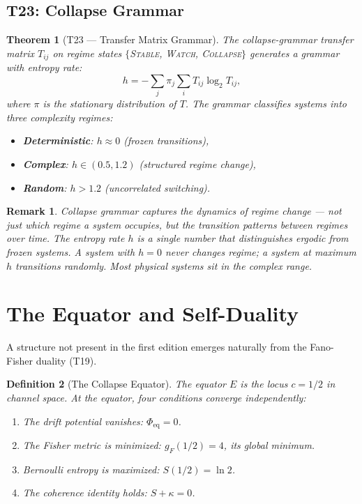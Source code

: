 \documentclass[
  aps,
  prd,
  preprint,
  superscriptaddress,
  nofootinbib,
  floatfix,
  longbibliography
]{revtex4-2}
\newtheorem{theorem}{Theorem}
\newtheorem{definition}[theorem]{Definition}
\newtheorem{remark}{Remark}
\newcommand{\beq}{\begin{equation}}
\newcommand{\eeq}{\end{equation}}
\newcommand{\regime}[1]{\textrm{\upshape\scshape#1}}
\newcommand{\Ent}{S}
\newcommand{\Logint}{\kappa}
\newcommand{\gFisher}{g_{\!F}}
\begin{document}
\subsection{T23: Collapse Grammar}

\begin{theorem}[T23 — Transfer Matrix Grammar]\label{thm:T23}
The collapse-grammar transfer matrix
$T_{ij}$ on regime states
$\{$\regime{Stable}, \regime{Watch}, \regime{Collapse}$\}$
generates a grammar with entropy rate:
\beq
  h = -\sum_{j} \pi_j \sum_{i} T_{ij} \log_2 T_{ij},
\eeq
where $\pi$ is the stationary distribution of $T$.
The grammar classifies systems into three complexity regimes:
\begin{itemize}[nosep,leftmargin=*]
  \item \textbf{Deterministic}: $h \approx 0$
    \quad(frozen transitions),
  \item \textbf{Complex}: $h \in (0.5, 1.2)$
    \quad(structured regime change),
  \item \textbf{Random}: $h > 1.2$
    \quad(uncorrelated switching).
\end{itemize}
\end{theorem}

\begin{remark}
Collapse grammar captures the \emph{dynamics} of regime
change — not just which regime a system occupies, but
the transition patterns between regimes over time.
The entropy rate $h$ is a single number that distinguishes
ergodic from frozen systems.
A system with $h = 0$ never changes regime;
a system at maximum $h$ transitions randomly.
Most physical systems sit in the complex range.
\end{remark}

\section{The Equator and Self-Duality}\label{sec:equator}

A structure not present in the first edition emerges naturally
from the Fano-Fisher duality (T19).

\begin{definition}[The Collapse Equator]\label{def:equator}
The equator $E$ is the locus $c = 1/2$ in channel space.
At the equator, four conditions converge independently:
\begin{enumerate}[nosep,leftmargin=*]
  \item The drift potential vanishes: $\Phi_{\mathrm{eq}} = 0$.
  \item The Fisher metric is minimized:
    $\gFisher(1/2) = 4$, its global minimum.
  \item Bernoulli entropy is maximized: $\Ent(1/2) = \ln 2$.
  \item The coherence identity holds: $\Ent + \Logint = 0$.
\end{enumerate}
\end{definition}
\end{document}
